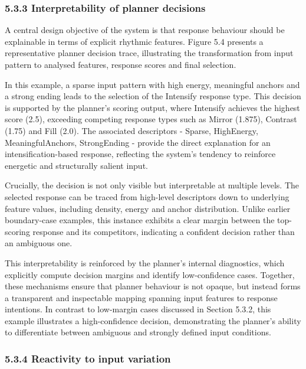 \subsubsection{5.3.3 Interpretability of planner
decisions}\label{interpretability-of-planner-decisions}

A central design objective of the system is that response behaviour
should be explainable in terms of explicit rhythmic features. Figure 5.4
presents a representative planner decision trace, illustrating the
transformation from input pattern to analysed features, response scores
and final selection.

In this example, a sparse input pattern with high energy, meaningful
anchors and a strong ending leads to the selection of the Intensify
response type. This decision is supported by the planner's scoring
output, where Intensify achieves the highest score (2.5), exceeding
competing response types such as Mirror (1.875), Contrast (1.75) and
Fill (2.0). The associated descriptors - Sparse, HighEnergy,
MeaningfulAnchors, StrongEnding - provide the direct explanation for an
intensification-based response, reflecting the system's tendency to
reinforce energetic and structurally salient input.

Crucially, the decision is not only visible but interpretable at
multiple levels. The selected response can be traced from high-level
descriptors down to underlying feature values, including density, energy
and anchor distribution. Unlike earlier boundary-case examples, this
instance exhibits a clear margin between the top-scoring response and
its competitors, indicating a confident decision rather than an
ambiguous one.

This interpretability is reinforced by the planner's internal
diagnostics, which explicitly compute decision margins and identify
low-confidence cases. Together, these mechanisms ensure that planner
behaviour is not opaque, but instead forms a transparent and inspectable
mapping spanning input features to response intentions. In contrast to
low-margin cases discussed in Section 5.3.2, this example illustrates a
high-confidence decision, demonstrating the planner's ability to
differentiate between ambiguous and strongly defined input conditions.

\subsubsection{5.3.4 Reactivity to input
variation}\label{reactivity-to-input-variation}

